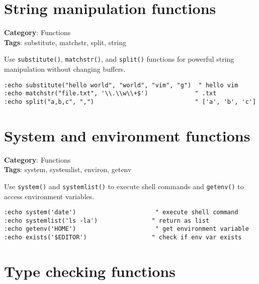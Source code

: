 {\section{String manipulation functions}

\textbf{Category}: Functions\\ \textbf{Tags}: substitute, matchstr, split, string
\vspace{0.5cm}

Use {\footnotesize \Verb§substitute()§}, {\footnotesize \Verb§matchstr()§}, and {\footnotesize \Verb§split()§} functions for powerful string manipulation without changing buffers.

\begin{Exa*}{}
\begin{Verbatim}[fontsize=\footnotesize, breaklines, breakanywhere]
:echo substitute("hello world", "world", "vim", "g")  " hello vim
:echo matchstr("file.txt", '\\.\\w\\+$')             " .txt
:echo split("a,b,c", ",")                            " ['a', 'b', 'c']
\end{Verbatim}
\end{Exa*}

\section{System and environment functions}

\textbf{Category}: Functions\\ \textbf{Tags}: system, systemlist, environ, getenv
\vspace{0.5cm}

Use {\footnotesize \Verb§system()§} and {\footnotesize \Verb§systemlist()§} to execute shell commands and {\footnotesize \Verb§getenv()§} to access environment variables.

\begin{Exa*}{}
\begin{Verbatim}[fontsize=\footnotesize, breaklines, breakanywhere]
:echo system('date')                      " execute shell command
:echo systemlist('ls -la')               " return as list
:echo getenv('HOME')                      " get environment variable
:echo exists('$EDITOR')                  " check if env var exists
\end{Verbatim}
\end{Exa*}

\section{Type checking functions}

}
